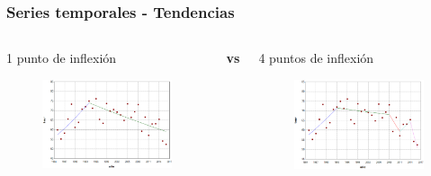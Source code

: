 \documentclass{beamer}
\begin{document}
\begin{frame}\frametitle{Series temporales - Tendencias}
	\begin{columns}
		\begin{column}{0.5\textwidth}
			\centering \normalsize 1 punto de inflexión
			\begin{figure}
				\includegraphics[width=\textwidth]{images/jpo1.png}
			\end{figure}
			
		\end{column}
		\large{\textbf{vs}}
		\begin{column}{0.5\textwidth}
			\centering \normalsize 4 puntos de inflexión
			\begin{figure}
				\centering
				\includegraphics[width=\textwidth]{images/jpo4.png}
			\end{figure}
		\end{column}
	\end{columns}
	

\end{frame}
\end{document}
